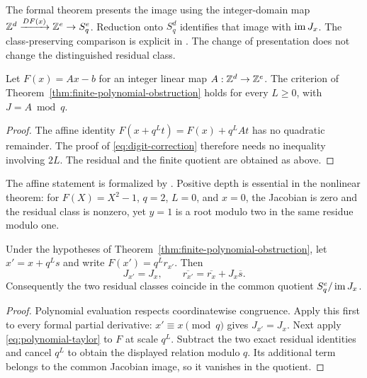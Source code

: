 The formal theorem
presents the image using the integer-domain map
$\mathbb Z^d\xrightarrow{DF(x)}\mathbb Z^e\to S_q^e$. Reduction onto $S_q^d$ identifies
that image with $\operatorname{im} J_x$. The class-preserving comparison is explicit in
. The change of
presentation does not change the distinguished residual class.

\begin{proposition}\label{prop:affine-obstruction}
Let $F(x)=Ax-b$ for an integer linear map $A:\mathbb Z^d\to\mathbb Z^e$. The criterion
of Theorem~\ref{thm:finite-polynomial-obstruction} holds for every $L\ge0$,
with $J=A\bmod q$.
\end{proposition}

\begin{proof}
The affine identity
$F(x+q^Lt)=F(x)+q^LAt$ has no quadratic remainder. The proof of
\eqref{eq:digit-correction} therefore needs no inequality involving $2L$.
The residual and the finite quotient are obtained as above.
\end{proof}

The affine statement is formalized by
.
Positive depth is essential in the nonlinear theorem: for $F(X)=X^2-1$,
$q=2$, $L=0$, and $x=0$, the Jacobian is zero and the residual class is
nonzero, yet $y=1$ is a root modulo two in the same residue modulo one.

\begin{proposition}
\label{prop:representative-independence}
Under the hypotheses of Theorem~\ref{thm:finite-polynomial-obstruction},
let $x'=x+q^Ls$ and write $F(x')=q^Lr_{x'}$. Then
\[
 J_{x'}=J_x,\qquad
 \overline{r_{x'}}=\overline{r_x}+J_x\overline s.
\]
Consequently the two residual classes coincide in the common quotient
$S_q^e/\operatorname{im} J_x$.
\end{proposition}

\begin{proof}
Polynomial evaluation respects coordinatewise congruence. Apply this first
to every formal partial derivative: $x'\equiv x\pmod q$ gives
$J_{x'}=J_x$. Next apply \eqref{eq:polynomial-taylor} to $F$ at scale $q^L$.
Subtract the two exact residual identities and cancel $q^L$ to obtain the
displayed relation modulo $q$. Its additional term belongs to the common
Jacobian image, so it vanishes in the quotient.
\end{proof}

